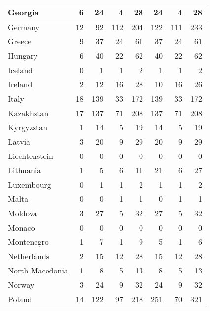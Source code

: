 \begin{table}
\begin{center}
\begin{tabular}{|l|r|r|r|r||r|r|r|}
                       Georgia&     6&    24&     4&    28&    24&     4&    28 \\\hline
                       Germany&    12&    92&   112&   204&   122&   111&   233 \\\hline
                        Greece&     9&    37&    24&    61&    37&    24&    61 \\\hline
                       Hungary&     6&    40&    22&    62&    40&    22&    62 \\\hline
                       Iceland&     0&     1&     1&     2&     1&     1&     2 \\\hline
                       Ireland&     2&    12&    16&    28&    10&    16&    26 \\\hline
                         Italy&    18&   139&    33&   172&   139&    33&   172 \\\hline
                    Kazakhstan&    17&   137&    71&   208&   137&    71&   208 \\\hline
                    Kyrgyzstan&     1&    14&     5&    19&    14&     5&    19 \\\hline
                        Latvia&     3&    20&     9&    29&    20&     9&    29 \\\hline
                 Liechtenstein&     0&     0&     0&     0&     0&     0&     0 \\\hline
                     Lithuania&     1&     5&     6&    11&    21&     6&    27 \\\hline
                    Luxembourg&     0&     1&     1&     2&     1&     1&     2 \\\hline
                         Malta&     0&     0&     1&     1&     0&     1&     1 \\\hline
                       Moldova&     3&    27&     5&    32&    27&     5&    32 \\\hline
                        Monaco&     0&     0&     0&     0&     0&     0&     0 \\\hline
                    Montenegro&     1&     7&     1&     9&     5&     1&     6 \\\hline
                   Netherlands&     2&    15&    12&    28&    15&    12&    28 \\\hline
               North Macedonia&     1&     8&     5&    13&     8&     5&    13 \\\hline
                        Norway&     3&    24&     9&    32&    24&     9&    32 \\\hline
                        Poland&    14&   122&    97&   218&   251&    70&   321 \\\hline

\end{tabular}
\end{center}
\end{table}
